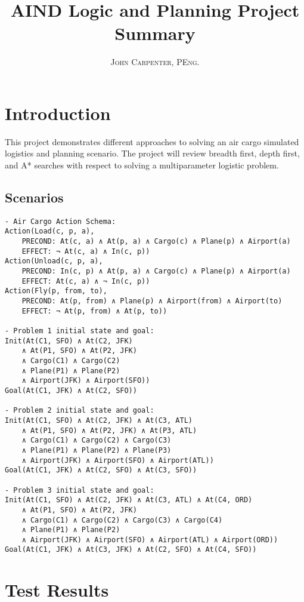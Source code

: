 \documentclass[paper=letter, fontsize=12pt]{article}
\title{\vspace{-15mm}\fontsize{24pt}{10pt}\selectfont\textbf{AIND Logic and Planning Project Summary}} %
\author{
\large
{\textsc{John Carpenter, PEng.}}\\[2mm]}
\date{}
\begin{document}
\maketitle %
\section{Introduction}

This project demonstrates different approaches to solving an air cargo simulated logistics and planning scenario. The project will review breadth first, depth first, and A* searches with respect to solving a multiparameter logistic problem.

\subsection{Scenarios}
\begin{verbatim}
- Air Cargo Action Schema:
Action(Load(c, p, a),
	PRECOND: At(c, a) ∧ At(p, a) ∧ Cargo(c) ∧ Plane(p) ∧ Airport(a)
	EFFECT: ¬ At(c, a) ∧ In(c, p))
Action(Unload(c, p, a),
	PRECOND: In(c, p) ∧ At(p, a) ∧ Cargo(c) ∧ Plane(p) ∧ Airport(a)
	EFFECT: At(c, a) ∧ ¬ In(c, p))
Action(Fly(p, from, to),
	PRECOND: At(p, from) ∧ Plane(p) ∧ Airport(from) ∧ Airport(to)
	EFFECT: ¬ At(p, from) ∧ At(p, to))

- Problem 1 initial state and goal:
Init(At(C1, SFO) ∧ At(C2, JFK)
	∧ At(P1, SFO) ∧ At(P2, JFK)
	∧ Cargo(C1) ∧ Cargo(C2)
	∧ Plane(P1) ∧ Plane(P2)
	∧ Airport(JFK) ∧ Airport(SFO))
Goal(At(C1, JFK) ∧ At(C2, SFO))

- Problem 2 initial state and goal:
Init(At(C1, SFO) ∧ At(C2, JFK) ∧ At(C3, ATL)
	∧ At(P1, SFO) ∧ At(P2, JFK) ∧ At(P3, ATL)
	∧ Cargo(C1) ∧ Cargo(C2) ∧ Cargo(C3)
	∧ Plane(P1) ∧ Plane(P2) ∧ Plane(P3)
	∧ Airport(JFK) ∧ Airport(SFO) ∧ Airport(ATL))
Goal(At(C1, JFK) ∧ At(C2, SFO) ∧ At(C3, SFO))

- Problem 3 initial state and goal:
Init(At(C1, SFO) ∧ At(C2, JFK) ∧ At(C3, ATL) ∧ At(C4, ORD)
	∧ At(P1, SFO) ∧ At(P2, JFK)
	∧ Cargo(C1) ∧ Cargo(C2) ∧ Cargo(C3) ∧ Cargo(C4)
	∧ Plane(P1) ∧ Plane(P2)
	∧ Airport(JFK) ∧ Airport(SFO) ∧ Airport(ATL) ∧ Airport(ORD))
Goal(At(C1, JFK) ∧ At(C3, JFK) ∧ At(C2, SFO) ∧ At(C4, SFO))

\end{verbatim}


\section{Test Results}
\end{document}

